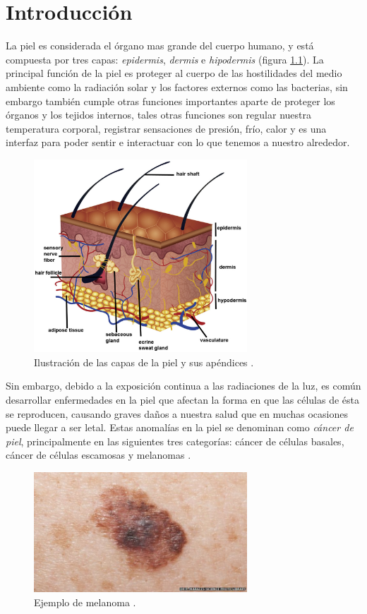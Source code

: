 
\chapter{Introducción}

La piel es considerada el órgano mas grande del cuerpo humano,  y está compuesta por tres capas: \emph{\gls{epidermis}}, \emph{\gls{dermis}} e \emph{\gls{hipodermis}} (figura \ref{fig:skin1_jpg}). La principal función de la piel es proteger al cuerpo de las hostilidades del medio ambiente como la radiación solar y los factores externos como las bacterias, sin embargo también cumple otras funciones importantes aparte de proteger los órganos y los tejidos internos, tales otras funciones son regular nuestra temperatura corporal, registrar sensaciones de presión, frío, calor y es una interfaz para poder sentir e interactuar con lo que tenemos a nuestro alrededor.

\begin{figure}[h!]
    \includegraphics[width=80mm, scale = 0.5]{Figuras/skin_structure1.jpg}
    \centering
    \caption{Ilustración de las capas de la piel y sus apéndices \citep{skin_1}.}
    \label{fig:skin1_jpg}
\end{figure}

Sin embargo, debido a la exposición continua a las radiaciones de la luz, es común desarrollar enfermedades en la piel que afectan la forma en que las células de ésta se reproducen, causando graves daños a nuestra salud que en muchas ocasiones puede llegar a ser letal. Estas anomalías en la piel se denominan como \emph{cáncer de piel}, principalmente en las siguientes tres categorías: cáncer de células basales, cáncer de células escamosas y melanomas \citep{cancer_org}.

\begin{figure}[h!]
    \includegraphics[width=80mm]{Figuras/skin_cancer_bbc.jpg}
    \centering
    \caption{Ejemplo de melanoma \citep{cancer_img_1}.}
    \label{fig:can_jpg}
\end{figure}

